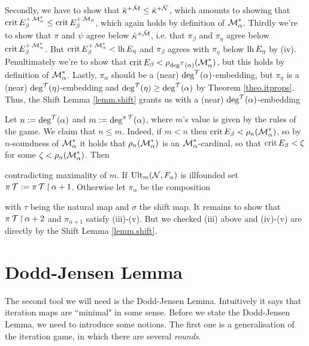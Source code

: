 {\qquad Secondly, we have to show that $\bar\kappa^{+\bar{\operatorname{\mathcal{M}}}}\leq\bar\kappa^{+\bar{\operatorname{\mathcal{N}}}}$, which amounts to showing that $\operatorname{crit} E_\beta^{+\operatorname{\mathcal{M}}_\alpha^*}\leq\operatorname{crit} E_\beta^{+\operatorname{\mathcal{M}}_\beta}$, which again holds by definition of $\operatorname{\mathcal{M}}_\alpha^*$. Thirdly we're to show that $\pi$ and $\psi$ agree below $\bar\kappa^{+\bar{\operatorname{\mathcal{M}}}}$, i.e. that $\pi_\beta$ and $\pi_\eta$ agree below $\operatorname{crit} E_\beta^{+\operatorname{\mathcal{M}}_\alpha^*}$. But $\operatorname{crit} E_\beta^{+\operatorname{\mathcal{M}}_\alpha^*}<\operatorname{lh} E_\eta$ and $\pi_\beta$ agrees with $\pi_\eta$ below $\operatorname{lh} E_\eta$ by (iv). Penultimately we're to show that $\operatorname{crit} E_\beta<\rho_{\deg^{\operatorname{\mathcal{T}}}(\alpha)}(\operatorname{\mathcal{M}}_\alpha^*)$, but this holds by definition of $\operatorname{\mathcal{M}}_\alpha^*$. Lastly, $\pi_\alpha$ should be a (near) $\deg^{\operatorname{\mathcal{T}}}(\alpha)$-embedding, but $\pi_\eta$ is a (near) $\deg^{\operatorname{\mathcal{T}}}(\eta)$-embedding and $\deg^{\operatorname{\mathcal{T}}}(\eta)\geq\deg^{\operatorname{\mathcal{T}}}(\alpha)$ by Theorem \ref{theo.itprops}. Thus, the Shift Lemma \ref{lemm.shift} grants us with a (near) $\deg^{\operatorname{\mathcal{T}}}(\alpha)$-embedding

Let $n:=\deg^{\operatorname{\mathcal{T}}}(\alpha)$ and $m:=\deg^{\pi\operatorname{\mathcal{T}}}(\alpha)$, where $m$'s value is given by the rules of the game. We claim that $n\leq m$. Indeed, if $m<n$ then $\operatorname{crit} E_\beta<\rho_n(\operatorname{\mathcal{M}}_\alpha^*)$, so by $n$-soundness of $\operatorname{\mathcal{M}}_\alpha^*$ it holds that $\rho_n(\operatorname{\mathcal{M}}_\alpha^*)$ is an $\operatorname{\mathcal{M}}_\alpha^*$-cardinal, so that $\operatorname{crit} E_\beta<\zeta$ for some $\zeta<\rho_n(\operatorname{\mathcal{M}}_\alpha^*)$. Then

contradicting maximality of $m$. If $\operatorname{Ult}_m(\operatorname{\mathcal{N}},F_\alpha)$ is illfounded set $\pi\operatorname{\mathcal{T}}:=\pi\operatorname{\mathcal{T}}\operatorname{\upharpoonright}\alpha+1$. Otherwise let $\pi_\alpha$ be the composition

with $\tau$ being the natural map and $\sigma$ the shift map. It remains to show that $\pi\operatorname{\mathcal{T}}\operatorname{\upharpoonright}\alpha+2$ and $\pi_{\alpha+1}$ satisfy (iii)-(v). But we checked (iii) above and (iv)-(v) are directly by the Shift Lemma \ref{lemm.shift}.
}

\section{Dodd-Jensen Lemma}

The second tool we will need is the Dodd-Jensen Lemma. Intuitively it says that iteration maps are ``minimal" in some sense. Before we state the Dodd-Jensen Lemma, we need to introduce some notions. The first one is a generalisation of the iteration game, in which there are several \textit{rounds}.

